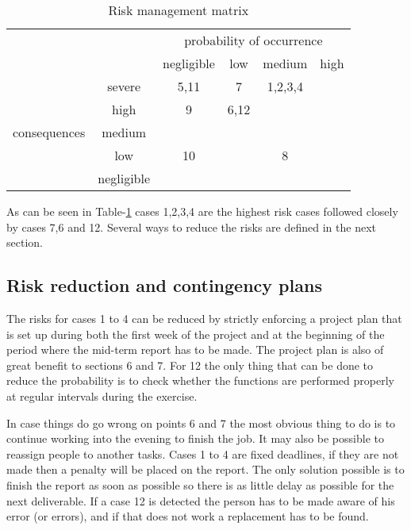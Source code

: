 \begin{table}
	\centering
		\begin{tabular}{c|c||c|c|c|c|}
		\multicolumn{2}{c||}{} & \multicolumn{4}{|c|}{probability of occurrence} \\ \cline{3-6}
		\multicolumn{2}{c||}{} & negligible & low & medium & high \\ \hline \hline
		\multirow{5}{*}{consequences} & severe & 5,11 & 7 & 1,2,3,4 &  \\ \cline{2-6}
		 & high & 9 & 6,12 &  &  \\ \cline{2-6}
		 & medium & & & & \\ \cline{2-6}
		 & low & 10 & & 8 & \\ \cline{2-6}
		 & negligible & & & & \\
		\hline
	\end{tabular}
	\caption{Risk management matrix}
	\label{tab:Riskmanagementmatrix}
\end{table}

As can be seen in Table-\ref{tab:Riskmanagementmatrix} cases 1,2,3,4 are the highest risk cases followed closely by cases 7,6 and 12. Several ways to reduce the risks are defined in the next section.

\subsection{Risk reduction and contingency plans}
The risks for cases 1 to 4 can be reduced by strictly enforcing a project plan that is set up during both the first week of the project and at the beginning of the period where the mid-term report has to be made. The project plan is also of great benefit to sections 6 and 7. For 12 the only thing that can be done to reduce the probability is to check whether the functions are performed properly at regular intervals during the exercise.

In case things do go wrong on points 6 and 7 the most obvious thing to do is to continue working into the evening to finish the job. It may also be possible to reassign people to another tasks. Cases 1 to 4 are fixed deadlines, if they are not made then a penalty will be placed on the report. The only solution possible is to finish the report as soon as possible so there is as little delay as possible for the next deliverable. If a case 12 is detected the person has to be made aware of his error (or errors), and if that does not work a replacement has to be found.